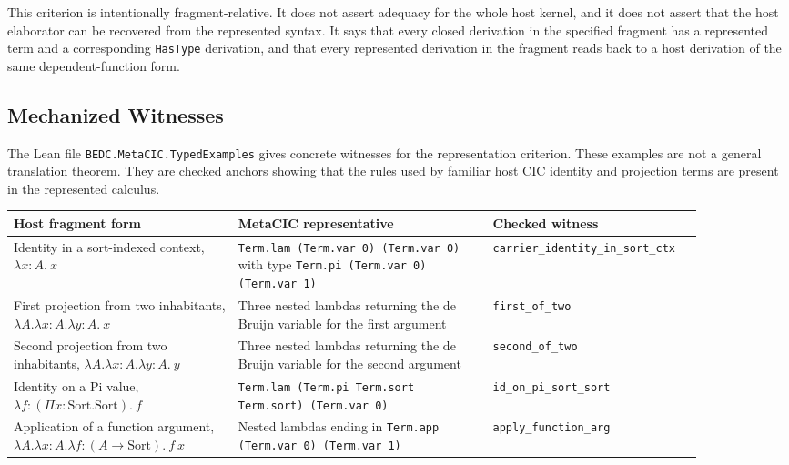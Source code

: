 This criterion is intentionally fragment-relative. It does not assert
adequacy for the whole host kernel, and it does not assert that the host
elaborator can be recovered from the represented syntax. It says that every
closed derivation in the specified fragment has a represented term and a
corresponding \texttt{HasType} derivation, and that every represented
derivation in the fragment reads back to a host derivation of the same
dependent-function form.

\subsection{Mechanized Witnesses}
\label{subsec:metacic-mechanized-witnesses}

The Lean file \texttt{BEDC.MetaCIC.TypedExamples} gives concrete witnesses
for the representation criterion. These examples are not a general translation
theorem. They are checked anchors showing that the rules used by familiar host
CIC identity and projection terms are present in the represented calculus.

\begin{center}
\begin{tabular}{p{0.30\linewidth}p{0.34\linewidth}p{0.24\linewidth}}
\hline
Host fragment form & MetaCIC representative & Checked witness \\
\hline
Identity in a sort-indexed context,
$\lambda x : A.\ x$ &
\texttt{Term.lam (Term.var 0) (Term.var 0)}
with type
\texttt{Term.pi (Term.var 0) (Term.var 1)} &
\texttt{carrier\_identity\_in\_sort\_ctx} \\
First projection from two inhabitants,
$\lambda A.\lambda x:A.\lambda y:A.\ x$ &
Three nested lambdas returning the de Bruijn variable for the first argument &
\texttt{first\_of\_two} \\
Second projection from two inhabitants,
$\lambda A.\lambda x:A.\lambda y:A.\ y$ &
Three nested lambdas returning the de Bruijn variable for the second argument &
\texttt{second\_of\_two} \\
Identity on a Pi value,
$\lambda f:(\Pi x:\mathrm{Sort}.\mathrm{Sort}).\ f$ &
\texttt{Term.lam (Term.pi Term.sort Term.sort) (Term.var 0)} &
\texttt{id\_on\_pi\_sort\_sort} \\
Application of a function argument,
$\lambda A.\lambda x:A.\lambda f:(A\to\mathrm{Sort}).\ f\ x$ &
Nested lambdas ending in
\texttt{Term.app (Term.var 0) (Term.var 1)} &
\texttt{apply\_function\_arg} \\
\hline
\end{tabular}
\end{center}

